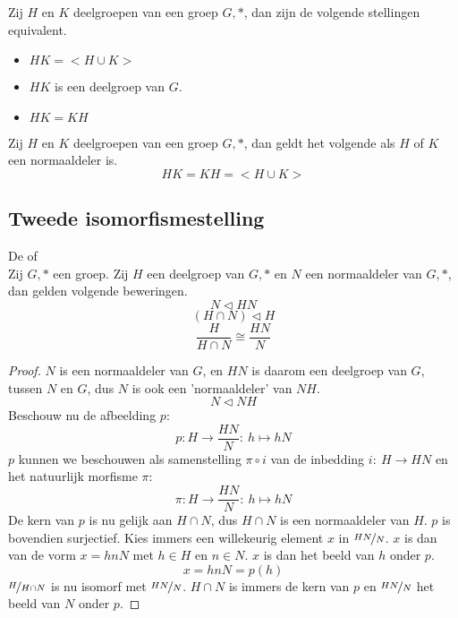 \documentclass[main.tex]{subfiles}
\begin{document}
\begin{pr}
  Zij $H$ en $K$ deelgroepen van een groep $G,*$, dan zijn de volgende stellingen equivalent.
  \begin{itemize}
  \item $HK = <H\cup K>$
  \item $HK$ is een deelgroep van $G$.
  \item $HK = KH$
  \end{itemize}
\end{pr}

\begin{gev}
  \label{gev:hk-deelgroep-als-h-of-k-normaaldeler}
  Zij $H$ en $K$ deelgroepen van een groep $G,*$, dan geldt het volgende als $H$ of $K$ een normaaldeler is.
  \[ HK = KH = <H\cup K> \]
\end{gev}

\subsection{Tweede isomorfismestelling}


\begin{st}
  De  of \\
  Zij $G,*$ een groep. Zij $H$ een deelgroep van $G,*$ en $N$ een normaaldeler van $G,*$, dan gelden volgende beweringen.
  \[ N \triangleleft HN \]
  \[ (H \cap N) \triangleleft H \]
  \[ \frac{H}{H\cap N} \cong \frac{HN}{N} \]

  \begin{proof}
    $N$ is een normaaldeler van $G$, en $HN$ is daarom een deelgroep van $G$, tussen $N$ en $G$, dus $N$ is ook een 'normaaldeler' van $NH$.
    \[ N \triangleleft NH \]
    Beschouw nu de afbeelding $p$:
    \[ p: H \rightarrow \frac{HN}{N}:\ h \mapsto hN \]
    $p$ kunnen we beschouwen als samenstelling $\pi \circ i$ van de inbedding $i:\ H\rightarrow HN$ en het natuurlijk morfisme $\pi$:
    \[ \pi: H \rightarrow \frac{HN}{N}:\ h \mapsto hN \]
    De kern van $p$ is nu gelijk aan $H\cap N$, dus $H \cap N$ is een normaaldeler van $H$.
    $p$ is bovendien surjectief.
    Kies immers een willekeurig element $x$ in $\nicefrac{HN}{N}$.
    $x$ is dan van de vorm $x=hnN$ met $h\in H$ en $n\in N$.
    $x$ is dan het beeld van $h$ onder $p$.
    \[ x = hnN = p(h) \]
    $\nicefrac{H}{H\cap N}$ is nu isomorf met $\nicefrac{HN}{N}$.
    $H\cap N$ is immers de kern van $p$ en $\nicefrac{HN}{N}$ het beeld van $N$ onder $p$.
  \end{proof}
\end{st}
\end{document}
